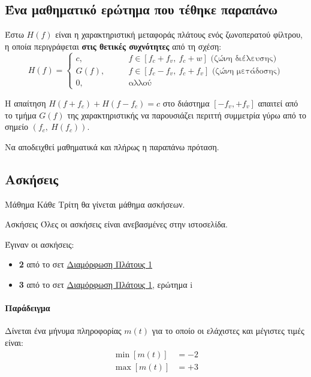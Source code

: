 \documentclass[11pt,a4paper,notitlepage,fleqn]{article}
\begin{document}

\subsection{Ένα μαθηματικό ερώτημα που τέθηκε παραπάνω}
\begin{infobox}{}
	Έστω \( H(f) \) είναι η χαρακτηριστική μεταφοράς πλάτους ενός ζωνοπερατού φίλτρου,
	η οποία περιγράφεται \textbf{στις θετικές συχνότητες} από τη σχέση:
	\[
	H(f) = \begin{cases}
	c, \qquad & f \in \left[ f_c+f_v,\ f_c+w \right]\text{ (ζώνη διέλευσης)} \\
	G(f),\qquad & f\in \left[f_c-f_v,\ f_c+f_v\right]\text{ (ζώνη μετάδοσης)} \\
	0,\qquad & \text{αλλού}
	\end{cases}
	\]
	
	Η απαίτηση \( H(f+f_c) + H(f-f_c) = c \) στο διάστημα \( [-f_v,+f_v] \) απαιτεί από
	το τμήμα \( G(f) \) της χαρακτηριστικής να παρουσιάζει περιττή συμμετρία γύρω από το
	σημείο \( \left(f_c,\ H(f_c)\right) \).
	
	Να αποδειχθεί μαθηματικά και πλήρως η παραπάνω πρόταση.
\end{infobox}

\subsection{Ασκήσεις}
\begin{attnbox}{Μάθημα}
	Κάθε Τρίτη θα γίνεται μάθημα ασκήσεων.
\end{attnbox}
\begin{attnbox}{Ασκήσεις}
	Όλες οι ασκήσεις είναι ανεβασμένες στην ιστοσελίδα.
\end{attnbox}

Έγιναν οι ασκήσεις:
\begin{itemize}
	\item \textbf{2} από το σετ
	\href{https://genesis.ee.auth.gr/dimakis/greek/courses/telesysI/exers/am.pdf}{Διαμόρφωση Πλάτους 1}
	\item \textbf{3} από το σετ
	\href{https://genesis.ee.auth.gr/dimakis/greek/courses/telesysI/exers/am.pdf}{Διαμόρφωση Πλάτους 1}, ερώτημα i
\end{itemize}

\paragraph{Παράδειγμα}
Δίνεται ένα μήνυμα πληροφορίας \( m(t) \) για το οποίο οι ελάχιστες και μέγιστες τιμές
είναι:
\begin{align*}
\min\left[m(t)\right] &= -2\\
\max\left[m(t)\right] &= +3
\end{align*}
\end{document}
